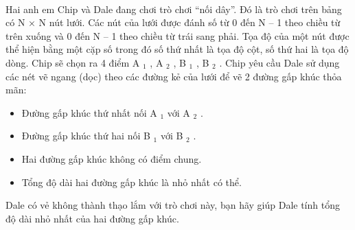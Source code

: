  

Hai anh em Chip và Dale đang chơi trò chơi “nối dây”. Đó là trò chơi trên bảng có N × N nút lưới. Các nút của lưới được đánh số từ 0 đến N – 1 theo chiều từ trên xuống và 0 đến N – 1 theo chiều từ trái sang phải. Tọa độ của một nút được thể hiện bằng một cặp số trong đó số thứ nhất là tọa độ cột, số thứ hai là tọa độ dòng. Chip sẽ chọn ra 4 điểm A $_ 1 $ , A $_ 2 $ , B $_ 1 $ , B $_ 2 $ . Chip yêu cầu Dale sử dụng các nét vẽ ngang (dọc) theo các đường kẻ của lưới để vẽ 2 đường gấp khúc thỏa mãn:
\begin{itemize}
	\item Đường gấp khúc thứ nhất nối A $_ 1 $ với A $_ 2 $ .
	\item Đường gấp khúc thứ hai nối B $_ 1 $ với B $_ 2 $ .
	\item Hai đường gấp khúc không có điểm chung.
	\item Tổng độ dài hai đường gấp khúc là nhỏ nhất có thể.
\end{itemize}

Dale có vẻ không thành thạo lắm với trò chơi này, bạn hãy giúp Dale tính tổng độ dài nhỏ nhất của hai đường gấp khúc.